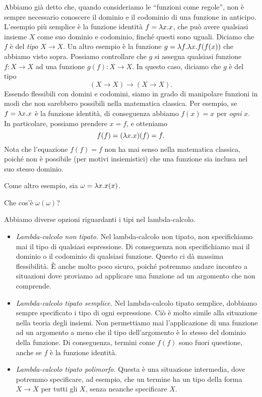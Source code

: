 \documentclass{article}
\begin{document}
Abbiamo gi\`a detto che, quando consideriamo le ``funzioni come regole'', 
non \`e sempre necessario conoscere il dominio e il codominio
di una funzione in anticipo. L'esempio pi\`u semplice \`e la funzione identit\`a
$f = \lambda x.x$, che pu\`o avere qualsiasi insieme $X$ come suo dominio e codominio,
finch\'e questi sono uguali. Diciamo che
$f$ \`e del {\em tipo} $X\to X$. Un altro esempio \`e la funzione $g = \lambda f.\lambda
x.f(f(x))$ che abbiamo visto sopra. Possiamo controllare che $g$ si assegna 
qualsiasi funzione $f:X\to X$ ad una funzione $g(f):X\to X$. In questo caso, diciamo
che $g$ \`e del tipo
\[          (X\to X)\to(X\to X).
\]
Essendo flessibili con domini e codomini, siamo in grado
di manipolare funzioni in modi che non sarebbero possibili
nella matematica classica. Per esempio, se $f=\lambda x.x$ \`e la funzione identit\`a,
di conseguenza abbiamo $f(x) = x$ per {\em ogni} $x$. In particolare, possiamo prendere
$x=f$, e otteniamo
\[     f(f) = (\lambda x.x)(f) = f.
\]
Nota che l'equazione $f(f)=f$ non ha mai senso nella matematica
classica, poich\'e non \`e possibile (per motivi insiemistici) che una
funzione sia inclusa nel suo stesso dominio.

Come altro esempio, sia $\omega = \lambda x.x(x)$. 

\begin{exercise}
  Che cos'\`e $\omega(\omega)$?
\end{exercise}

Abbiamo diverse opzioni riguardanti i tipi nel lambda-calcolo.
\begin{itemize}
\item {\em Lambda-calcolo non tipato.} Nel lambda-calcolo non tipato,
non specifichiamo mai il tipo di qualsiasi espressione. Di conseguenza
non specifichiamo mai il dominio o il codominio di qualsiasi funzione. Questo ci 
d\`a massima flessibilit\`a. \`E anche molto poco sicuro, poich\'e potremmo andare incontro a
situazioni dove proviamo ad applicare una funzione ad un argomento che
non comprende.
\item {\em Lambda-calcolo tipato semplice.} Nel lambda-calcolo tipato semplice,
dobbiamo sempre specificato i tipo di ogni espressione.
Ci\`o \`e molto simile alla situazione nella teoria degli insiemi. Non permettiamo
mai l'applicazione di una funzione ad un argomento a meno che il tipo
dell'argomento \`e lo stesso del dominio della funzione. Di conseguenza,
termini come $f(f)$ sono fuori questione, anche se $f$ \`e la funzione identit\`a.
\item {\em Lambda-calcolo tipato polimorfo.} Questa \`e una
situazione intermedia, dove potremmo specificare, ad esempio, che
un termine ha un tipo della forma $X\to X$ per tutti gli $X$, senza neanche
specificare $X$.
\end{itemize}
\end{document}
